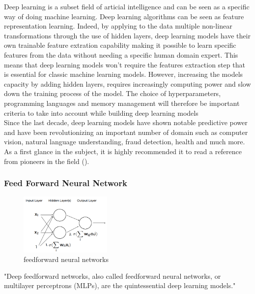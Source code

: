 \documentclass[letter,8pt]{article}\usepackage[]{graphicx}\usepackage[]{color}
\begin{document}
Deep learning is a subset field of articial intelligence and can be seen as a specific way of doing machine learning. Deep learning algorithms can be seen as feature representation learning. Indeed, by applying to the data multiple non-linear transformations through the use of hidden layers, deep learning models have their own trainable feature extration capability making it possible to learn specific features from the data without needing a specific human domain expert. This means that deep learning models won't require the features extraction step that is essential for classic machine learning models. However, increasing the models capacity by adding hidden layers, requires increasingly computing power and slow down the training process of the model. The choice of hyperparameters, programming languages and memory management will therefore be important criteria to take into account while building deep learning models\\
Since the last decade, deep learning models have shown notable predictive power and have been revolutionizing an important number of domain such as computer vision, natural language understanding, fraud detection, health and much more.\\
As a first glance in the subject, it is highly recommended it to read  a reference from pioneers in the field (\cite[Chapter 1]{Goodfellow-et-al-2016}).


\subsubsection{Feed Forward Neural Network}
\begin{figure}
  \begin{center}
    \includegraphics[width=0.4\textwidth]{figure/feedforward_neural_networks.png}
  \end{center}
  \caption{feedforward neural networks}
  \label{fig:attention}
\end{figure}

"Deep feedforward networks, also called feedforward neural networks, or multilayer perceptrons (MLPs), are the quintessential deep learning models." \cite{Goodfellow-et-al-2016}
\end{document}
